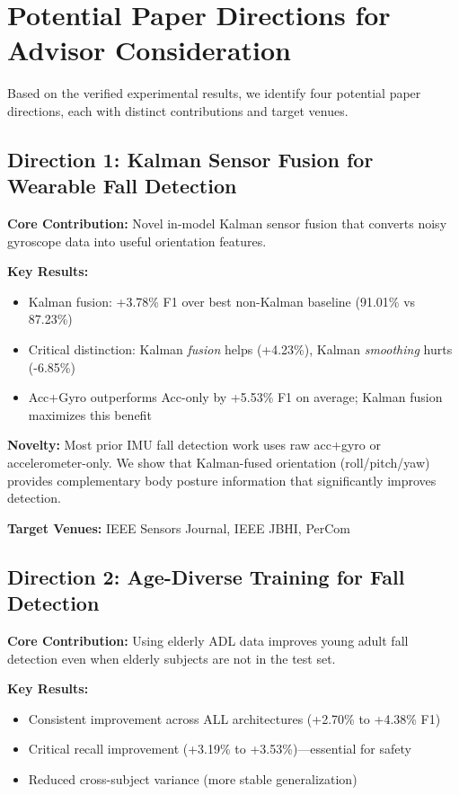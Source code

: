 \documentclass{article}
\begin{document}
\section{Potential Paper Directions for Advisor Consideration}

Based on the verified experimental results, we identify four potential paper directions, each with distinct contributions and target venues.

\subsection{Direction 1: Kalman Sensor Fusion for Wearable Fall Detection}

\textbf{Core Contribution:} Novel in-model Kalman sensor fusion that converts noisy gyroscope data into useful orientation features.

\textbf{Key Results:}
\begin{itemize}
    \item Kalman fusion: +3.78\% F1 over best non-Kalman baseline (91.01\% vs 87.23\%)
    \item Critical distinction: Kalman \textit{fusion} helps (+4.23\%), Kalman \textit{smoothing} hurts (-6.85\%)
    \item Acc+Gyro outperforms Acc-only by +5.53\% F1 on average; Kalman fusion maximizes this benefit
\end{itemize}

\textbf{Novelty:} Most prior IMU fall detection work uses raw acc+gyro or accelerometer-only. We show that Kalman-fused orientation (roll/pitch/yaw) provides complementary body posture information that significantly improves detection.

\textbf{Target Venues:} IEEE Sensors Journal, IEEE JBHI, PerCom

\subsection{Direction 2: Age-Diverse Training for Fall Detection}

\textbf{Core Contribution:} Using elderly ADL data improves young adult fall detection even when elderly subjects are not in the test set.

\textbf{Key Results:}
\begin{itemize}
    \item Consistent improvement across ALL architectures (+2.70\% to +4.38\% F1)
    \item Critical recall improvement (+3.19\% to +3.53\%)---essential for safety
    \item Reduced cross-subject variance (more stable generalization)
\end{itemize}
\end{document}
